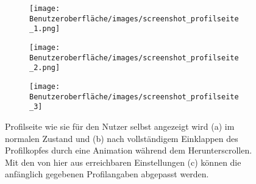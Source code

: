 \begin{figure}[tbt]
	\begin{subfigure}{0.33\textwidth}
	\centering
	\texttt{[image: Benutzeroberfläche/images/screenshot\_profilseite\_1.png]}
	\caption{}
	\label{fig:profilseite_a}
	\end{subfigure}
	\begin{subfigure}{0.33\textwidth}
	\centering
	\texttt{[image: Benutzeroberfläche/images/screenshot\_profilseite\_2.png]}
	\caption{}
	\label{fig:profilseite_b}
	\end{subfigure}
	\begin{subfigure}{0.33\textwidth}
	\centering
	\texttt{[image: Benutzeroberfläche/images/screenshot\_profilseite\_3]}
	\caption{}
	\label{fig:profilseite_c}
	\end{subfigure}
\caption[Screenshots der Profilseite]{Profilseite wie sie für den Nutzer selbst angezeigt wird (a) im normalen Zustand und (b) nach vollständigem Einklappen des Profilkopfes durch eine Animation während dem Herunterscrollen. Mit den von hier aus erreichbaren Einstellungen (c) können die anfänglich gegebenen Profilangaben abgepasst werden.}
\label{fig:profilseite_alle}
\end{figure}
